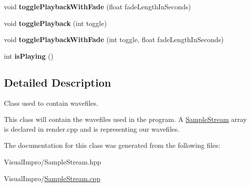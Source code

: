 \begin{DoxyCompactItemize}
void {\bfseries toggle\+Playback\+With\+Fade} (float fade\+Length\+In\+Seconds)
\item 
\mbox{\label{class_sample_stream_ac88f4965128c5842b989d6c07bec4cd1}} 
void {\bfseries toggle\+Playback} (int toggle)
\item 
\mbox{\label{class_sample_stream_a782316681eec29a483a537388b3e2ecc}} 
void {\bfseries toggle\+Playback\+With\+Fade} (int toggle, float fade\+Length\+In\+Seconds)
\item 
\mbox{\label{class_sample_stream_a3e4689ad7cbde4e182a4839a194636a1}} 
int {\bfseries is\+Playing} ()
\end{DoxyCompactItemize}


\subsection{Detailed Description}
Class used to contain wavefiles. 

This class will contain the wavefiles used in the program. A \mbox{\hyperlink{class_sample_stream}{Sample\+Stream}} array is declared in render.\+cpp and is representing our wavefiles. 

The documentation for this class was generated from the following files\+:\begin{DoxyCompactItemize}
\item 
Visual\+Impro/Sample\+Stream.\+hpp\item 
Visual\+Impro/\mbox{\hyperlink{_sample_stream_8cpp}{Sample\+Stream.\+cpp}}\end{DoxyCompactItemize}

